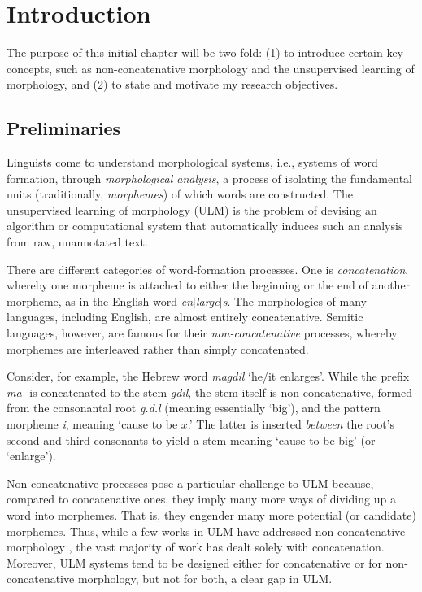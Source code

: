\chapter{Introduction}\label{ch:intro}

The purpose of this initial chapter will be two-fold: (1) to 
introduce certain key concepts, such as non-concatenative morphology 
and the unsupervised learning of morphology, 
and (2) to state and motivate my research objectives. 

\section{Preliminaries} 
Linguists come to understand morphological 
systems, i.e., systems of word formation, through 
\emph{morphological analysis}, a process of isolating the fundamental units
(traditionally, \emph{morphemes}) of which words are constructed. 
The unsupervised learning of morphology (ULM) is the problem of devising an 
algorithm or computational system that
automatically induces such an analysis from raw, unannotated text.

There are different categories of word-formation processes.
One is \emph{concatenation}, whereby one morpheme is attached 
to either the beginning or the end of another morpheme, as in the 
English word \textit{en}$|$\textit{large}$|$\textit{s}. 
The morphologies of many languages, including English, 
are almost entirely concatenative. Semitic languages, however, are 
famous for their \emph{non-concatenative} processes, whereby 
morphemes are interleaved rather than simply concatenated.

Consider, for example, the Hebrew word 
\textit{magdil} `he/it enlarges'. While the prefix \textit{ma-} is 
concatenated to the stem \textit{gdil}, the stem itself is 
non-concatenative, formed from the consonantal root \textit{g.d.l} 
(meaning essentially `big'), and the pattern morpheme \textit{i}, meaning 
`cause to be $x$.'
The latter is inserted 
\textit{between} the root's second and third consonants 
to yield a stem meaning `cause to be big' (or `enlarge').

Non-concatenative processes pose a particular challenge to 
ULM because, 
compared to concatenative ones, 
they imply many more ways of dividing up a word into morphemes. 
That is, they engender many more potential (or candidate) morphemes.   
Thus, while a few works in ULM have addressed non-concatenative 
morphology 
\citep[e.g.,][]{rodrigues-and-cavar:2005, botha:blunsom:13}, 
the vast majority 
of work has dealt solely with concatenation.
Moreover, ULM systems tend 
to be designed either for concatenative or for non-concatenative morphology, 
but not for both, a clear gap in ULM.

